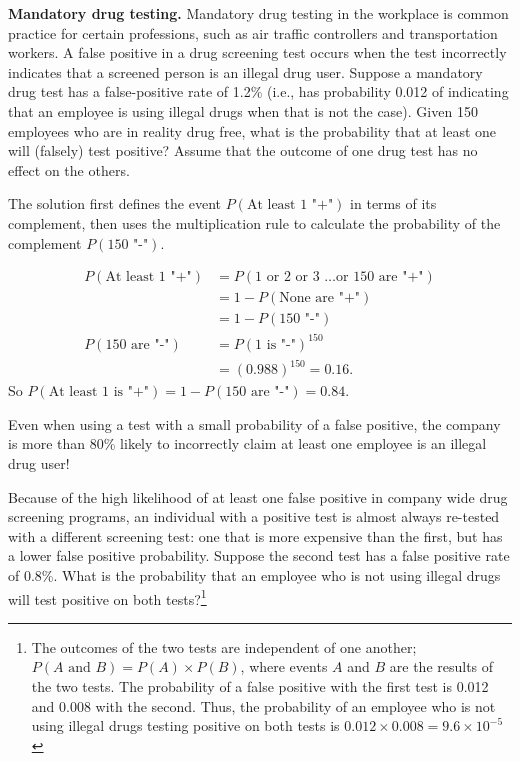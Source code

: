 \begin{example}{\textbf{Mandatory drug testing.} Mandatory drug testing in the workplace is common practice for certain professions, such as air traffic controllers and transportation workers.  A false positive in a drug screening test occurs when the test incorrectly indicates that a screened person is an illegal drug user. Suppose a mandatory drug test has a false-positive rate of 1.2\% (i.e., has probability  0.012 of indicating that an employee is using illegal drugs when that is not the case).  Given 150 employees who are in reality drug free, what is the probability that at least one will (falsely) test positive? Assume that the outcome of one drug test has no effect on the others.}

The solution first defines the event $P(\text{At least 1 "+"})$ in terms of its complement, then uses the multiplication rule to calculate the probability of the complement $P(\text{150 "-"})$.

   \begin{align*} 
   P(\text{At least 1 "+"}) &= P(\text{1 or 2 or 3 \ldots or 150 are "+"}) \\
           &= 1 - P(\text{None are "+"}) \\
           &= 1 - P(\text{150 "-"}) \\
 P(\text{150 are "-"}) &= P(\text{1 is "-"})^{150} \\
           &= (0.988)^{150} = 0.16.
    \end{align*}
   So $P(\text{At least 1 is "+"})  = 1 - P(\text{150 are "-"}) = 0.84.$
 

Even when using a test with a small probability of a false positive, the company is more than 80\% likely to incorrectly claim at least one employee is an illegal drug user!

\end{example}

\begin{exercise}
Because of the high likelihood of at least one false positive in company wide drug screening programs, an individual with a positive test is almost always re-tested with a different screening test: one that is more expensive than the first, but has a lower false positive probability. Suppose the second test has a false positive rate of 0.8\%.  What is the probability that an employee who is not using illegal drugs will test positive on both tests?\footnote{The outcomes of the two tests are independent of one another; $P (A\text{ and } B) = P(A) \times P(B)$, where events $A$ and $B$ are the results of the two tests. The probability of a false positive with the first test is 0.012 and 0.008 with the second. Thus, the probability of an employee who is not using illegal drugs testing positive on both tests is $0.012 \times 0.008 = 9.6 \times 10^{-5}$}

\end{exercise}

